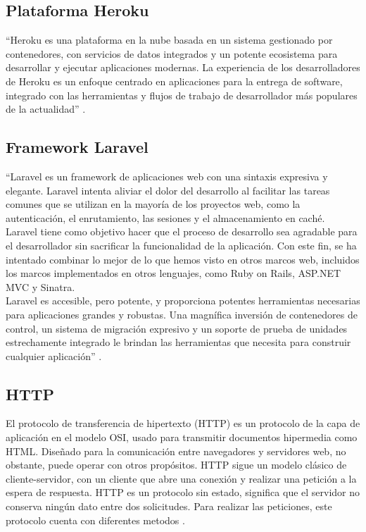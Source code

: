 \subsection{Plataforma Heroku}

``Heroku es una plataforma en la nube basada en un sistema gestionado por contenedores, con servicios de datos integrados y un potente ecosistema para desarrollar y ejecutar aplicaciones modernas. La experiencia de los desarrolladores de Heroku es un enfoque centrado en aplicaciones para la entrega de software, integrado con las herramientas y flujos de trabajo de desarrollador más populares de la actualidad'' \cite{Hero}.


\subsection{Framework Laravel}

``Laravel es un framework de aplicaciones web con una sintaxis expresiva y elegante. Laravel intenta aliviar el dolor del desarrollo al facilitar las tareas comunes que se utilizan en la mayoría de los proyectos web, como la autenticación, el enrutamiento, las sesiones y el almacenamiento en caché.\\

Laravel tiene como objetivo hacer que el proceso de desarrollo sea agradable para el desarrollador sin sacrificar la funcionalidad de la aplicación. Con este fin, se ha intentado combinar lo mejor de lo que hemos visto en otros marcos web, incluidos los marcos implementados en otros lenguajes, como Ruby on Rails, ASP.NET MVC y Sinatra.\\

Laravel es accesible, pero potente, y proporciona potentes herramientas necesarias para aplicaciones grandes y robustas. Una magnífica inversión de contenedores de control, un sistema de migración expresivo y un soporte de prueba de unidades estrechamente integrado le brindan las herramientas que necesita para construir cualquier aplicación'' \cite{Lara}.

\subsection{HTTP}

El protocolo de transferencia de hipertexto (HTTP) es un protocolo de la capa de aplicación en el modelo OSI, usado para transmitir documentos hipermedia como HTML. Diseñado para la comunicación entre navegadores y servidores web, no obstante, puede operar con otros propósitos. HTTP sigue un modelo clásico de cliente-servidor, con un cliente que abre una conexión y realizar una petición a la espera de respuesta. HTTP es un protocolo sin estado, significa que el servidor no conserva ningún dato entre dos solicitudes. Para realizar las peticiones, este protocolo cuenta con diferentes metodos \cite{HTTP}.


